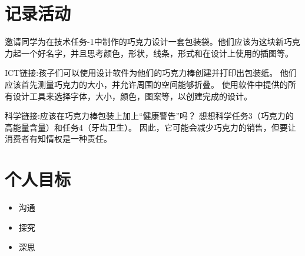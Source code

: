 \section{记录活动}
   邀请同学为在技术任务-1中制作的巧克力设计一套包装袋。他们应该为这块新巧克力起一个好名字，并且思考颜色，形状，线条，形式和在设计上使用的插图等。\par
   ICT链接:孩子们可以使用设计软件为他们的巧克力棒创建并打印出包装纸。 他们应该首先测量巧克力的大小，并允许周围的空间能够折叠。 使用软件中提供的所有设计工具来选择字体，大小，颜色，图案等，以创建完成的设计。\par
   科学链接:应该在巧克力棒包装上加上“健康警告”吗？ 想想科学任务3（巧克力的高能量含量）和任务4（牙齿卫生）。 因此，它可能会减少巧克力的销售，但要让消费者有知情权是一种责任。



\section{个人目标}


\begin{itemize}
  \item 沟通
  \item 探究
  \item 深思  
\end{itemize}
